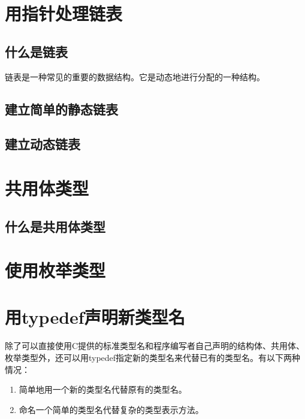 \section{用指针处理链表}
\subsection{什么是链表}
链表是一种常见的重要的数据结构。它是动态地进行分配的一种结构。
\subsection{建立简单的静态链表}
\subsection{建立动态链表}
\section{共用体类型}
\subsection{什么是共用体类型}
\section{使用枚举类型}
\section{用typedef声明新类型名}
除了可以直接使用C提供的标准类型名和程序编写者自己声明的结构体、共用体、枚举类型外，还可以用typedef指定新的类型名来代替已有的类型名。有以下两种情况：
\begin{enumerate}
	\item 简单地用一个新的类型名代替原有的类型名。
	\item 命名一个简单的类型名代替复杂的类型表示方法。
\end{enumerate}
